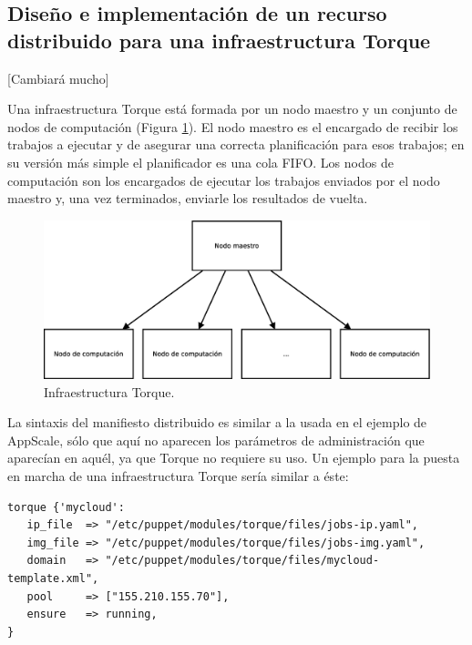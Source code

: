 \subsection{Diseño e implementación de un recurso distribuido para una infraestructura Torque}

[Cambiará mucho]

Una infraestructura Torque está formada por un nodo maestro y un conjunto de nodos de computación (Figura \ref{figure:arquitectura-torque}). El nodo maestro es el encargado de recibir los trabajos a ejecutar y de asegurar una correcta planificación para esos trabajos; en su versión más simple el planificador es una cola FIFO. Los nodos de computación son los encargados de ejecutar los trabajos enviados por el nodo maestro y, una vez terminados, enviarle los resultados de vuelta.

\begin{figure} [!htbp]
  \centering
  \includegraphics[width=13.5cm]{figuras/Arquitectura_Torque.eps}
  \caption{Infraestructura Torque.}
\label{figure:arquitectura-torque}
\end{figure}


La sintaxis del manifiesto distribuido es similar a la usada en el ejemplo de AppScale, sólo que aquí no aparecen los parámetros de administración que aparecían en aquél, ya que Torque no requiere su uso. Un ejemplo para la puesta en marcha de una infraestructura Torque sería similar a éste:

\begin{lstlisting}
torque {'mycloud':
   ip_file  => "/etc/puppet/modules/torque/files/jobs-ip.yaml",
   img_file => "/etc/puppet/modules/torque/files/jobs-img.yaml",
   domain   => "/etc/puppet/modules/torque/files/mycloud-template.xml",
   pool     => ["155.210.155.70"],
   ensure   => running,
}
\end{lstlisting}

